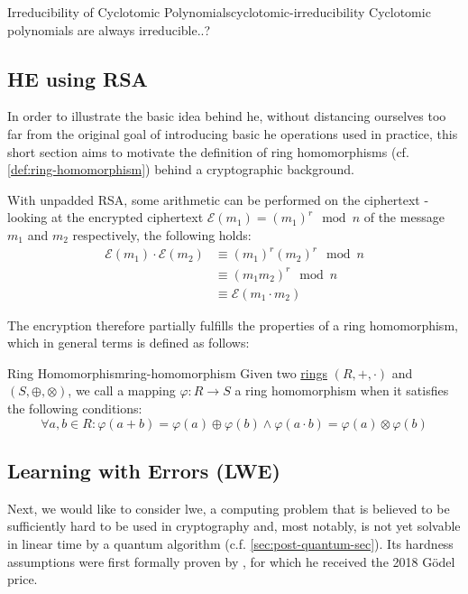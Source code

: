 \begin{remark}{Irreducibility of Cyclotomic Polynomials}{cyclotomic-irreducibility}
  Cyclotomic polynomials are always irreducible..?
\end{remark}

\subsection{HE using RSA}
In order to illustrate the basic idea behind \Gls{he}, without distancing ourselves too far
from the original goal of introducing basic \gls{he} operations used in practice, this short section aims to motivate
the definition of ring homomorphisms (cf. \autoref{def:ring-homomorphism}) behind a cryptographic background.

With unpadded RSA, some arithmetic can be performed on the ciphertext - %
looking at the encrypted ciphertext $\mathcal{E}(m_1) = (m_1)^r \mod n$
of the message $m_1$ and $m_2$ respectively, the following holds:
\begin{align*}
  \mathcal{E}(m_1) \cdot \mathcal{E}(m_2)
   & \equiv (m_1)^r (m_2)^r \mod n     \\
   & \equiv (m_1 m_2)^r \mod n         \\
   & \equiv \mathcal{E}(m_1 \cdot m_2)
\end{align*}

The encryption therefore partially fulfills the properties of a ring homomorphism,
which in general terms is defined as follows:

\begin{definition}{Ring Homomorphism}{ring-homomorphism}
  Given two \hyperref[def:ring]{rings} $(R, +, \cdot)$ and $(S, \oplus, \otimes)$, we call a mapping $\varphi: R \rightarrow S$
  a ring homomorphism when it satisfies the following conditions:
  $$\forall a, b \in R: \varphi(a + b) = \varphi(a) \oplus \varphi(b) \wedge \varphi(a \cdot b) =
    \varphi(a) \otimes \varphi(b)$$
\end{definition}

\subsection{Learning with Errors (LWE)}
\label{subsec:lwe}
Next, we would like to consider \Gls{lwe}, a computing problem that is believed to be sufficiently hard
to be used in cryptography and, most notably, is not yet solvable in linear time by a quantum algorithm
(c.f. \autoref{sec:post-quantum-sec}).
Its hardness assumptions were first formally proven by \citeauthor{2005-lwe-original},
for which he received the 2018 Gödel price.

